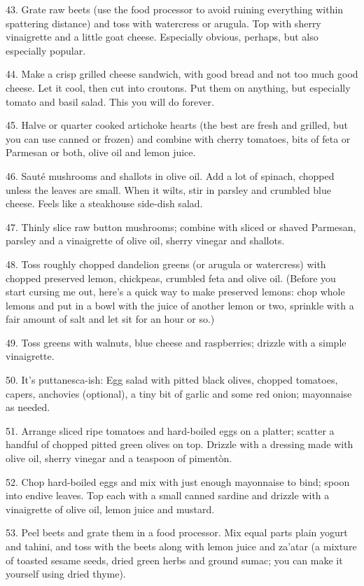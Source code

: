 \begin{recipe}
43. Grate raw beets (use the food processor to avoid ruining
everything within spattering distance) and toss with watercress or
arugula. Top with sherry vinaigrette and a little goat
cheese. Especially obvious, perhaps, but also especially popular.

44. Make a crisp grilled cheese sandwich, with good bread and not too
much good cheese. Let it cool, then cut into croutons. Put them on
anything, but especially tomato and basil salad. This you will do
forever.

45. Halve or quarter cooked artichoke hearts (the best are fresh and
grilled, but you can use canned or frozen) and combine with cherry
tomatoes, bits of feta or Parmesan or both, olive oil and lemon juice.

46. Saut\'e mushrooms and shallots in olive oil. Add a lot of spinach,
chopped unless the leaves are small. When it wilts, stir in parsley
and crumbled blue cheese. Feels like a steakhouse side-dish salad.

47. Thinly slice raw button mushrooms; combine with sliced or shaved
Parmesan, parsley and a vinaigrette of olive oil, sherry vinegar and
shallots.

48. Toss roughly chopped dandelion greens (or arugula or watercress)
with chopped preserved lemon, chickpeas, crumbled feta and olive
oil. (Before you start cursing me out, here's a quick way to make
preserved lemons: chop whole lemons and put in a bowl with the juice
of another lemon or two, sprinkle with a fair amount of salt and let
sit for an hour or so.)

49. Toss greens with walnuts, blue cheese and raspberries; drizzle
with a simple vinaigrette.

50. It's puttanesca-ish: Egg salad with pitted black olives, chopped
tomatoes, capers, anchovies (optional), a tiny bit of garlic and some
red onion; mayonnaise as needed.

51. Arrange sliced ripe tomatoes and hard-boiled eggs on a platter;
scatter a handful of chopped pitted green olives on top. Drizzle with
a dressing made with olive oil, sherry vinegar and a teaspoon of
piment\`on.

52. Chop hard-boiled eggs and mix with just enough mayonnaise to bind;
spoon into endive leaves. Top each with a small canned sardine and
drizzle with a vinaigrette of olive oil, lemon juice and mustard.

53. Peel beets and grate them in a food processor. Mix equal parts
plain yogurt and tahini, and toss with the beets along with lemon
juice and za'atar (a mixture of toasted sesame seeds, dried green
herbs and ground sumac; you can make it yourself using dried thyme).


\end{recipe}

